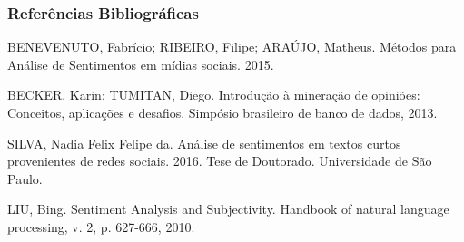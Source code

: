 \documentclass{beamer}
\begin{document}
\begin{frame}

\frametitle{Referências Bibliográficas}
BENEVENUTO, Fabrício; RIBEIRO, Filipe; ARAÚJO, Matheus. Métodos para Análise de
Sentimentos em mídias sociais. 2015.\newline

BECKER, Karin; TUMITAN, Diego. Introdução à mineração de opiniões: Conceitos, aplicações e desafios. Simpósio brasileiro de banco de dados, 2013.\newline

SILVA, Nadia Felix Felipe da. Análise de sentimentos em textos curtos provenientes de redes sociais. 2016. Tese de Doutorado. Universidade de São Paulo.\newline

LIU, Bing. Sentiment Analysis and Subjectivity. Handbook of natural language processing, v. 2, p. 627-666, 2010.

\end{frame}
\end{document}
